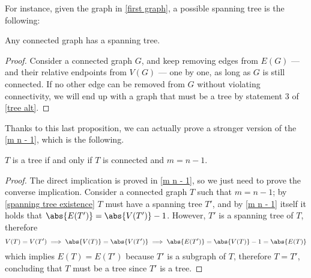 \documentclass[a4paper, 12pt]{report}
\begin{document}
    For instance, given the graph in \cref{first graph}, a possible spanning tree is the following:

    \begin{figure}[H]
        \centering
    \end{figure}

    \begin{framedlem}[label={spanning tree existence}]{}
        Any connected graph has a spanning tree.
    \end{framedlem}

    \begin{proof}
        Consider a connected graph $G$, and keep removing edges from $E(G)$ --- and their relative endpoints from $V(G)$ --- one by one, as long as $G$ is still connected. If no other edge can be removed from $G$ without violating connectivity, we will end up with a graph that must be a tree by statement 3 of \cref{tree alt}.
    \end{proof}

    Thanks to this last proposition, we can actually prove a stronger version of the \cref{m n - 1}, which is the following.

    \begin{framedthm}{}
        $T$ is a tree if and only if $T$ is connected and $m = n - 1$.
    \end{framedthm}

    \begin{proof}
        The direct implication is proved in \cref{m n - 1}, so we just need to prove the converse implication. Consider a connected graph $T$ such that $m = n - 1$; by \cref{spanning tree existence} $T$ must have a spanning tree $T'$, and by \cref{m n - 1} itself it holds that $\abs{E(T')} = \abs{V(T')} - 1$. However, $T'$ is a spanning tree of $T$, therefore $$V(T) = V(T') \implies \abs{V(T)} = \abs{V(T')} \implies \abs{E(T')} = \abs{V(T)} - 1 = \abs{E(T)}$$ which implies $E(T) = E(T')$ because $T'$ is a subgraph of $T$, therefore $T = T'$, concluding that $T$ must be a tree since $T'$ is a tree.
    \end{proof}
\end{document}
